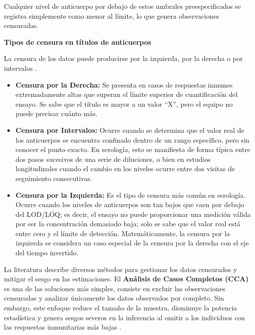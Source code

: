 Cualquier nivel de anticuerpo por debajo de estos umbrales preespecificados se registra simplemente como menor al límite, lo que genera observaciones censuradas.

\vspace{\baselineskip}
\textbf{Tipos de censura en títulos de anticuerpos}
\vspace{\baselineskip}

La censura de los datos puede producirse por la izquierda, por la derecha o por intervalos \cite{turkson, tran2021measuring}.
\begin{itemize}
	\item \textbf{Censura por la Derecha:} Se presenta en casos de respuestas inmunes extremadamente altas que superan el límite superior de cuantificación del ensayo. Se sabe que el título es mayor a un valor \enquote{X}, pero el equipo no puede precisar cuánto más.
	
	\item \textbf{Censura por Intervalos:} Ocurre cuando se determina que el valor real de los anticuerpos se encuentra confinado dentro de un rango específico, pero sin conocer el punto exacto. En serología, esto se manifiesta de forma típica entre dos pasos sucesivos de una serie de diluciones, o bien en estudios longitudinales cuando el cambio en los niveles ocurre entre dos visitas de seguimiento consecutivas.
	
	\item \textbf{Censura por la Izquierda:} Es el tipo de censura más común en serología. Ocurre cuando los niveles de anticuerpos son tan bajos que caen por debajo del LOD/LOQ; es decir, el ensayo no puede proporcionar una medición válida por ser la concentración demasiado baja; solo se sabe que el valor real está entre cero y el límite de detección. Matemáticamente, la censura por la izquierda se considera un caso especial de la censura por la derecha con el eje del tiempo invertido.
\end{itemize}

La literatura describe diversos métodos para gestionar los datos censurados y mitigar el sesgo en las estimaciones. El \textbf{Análisis de Casos Completos (CCA)} es una de las soluciones más simples, consiste en excluir las observaciones censuradas y analizar únicamente los datos observados por completo. Sin embargo, este enfoque reduce el tamaño de la muestra, disminuye la potencia estadística y genera sesgos severos en la inferencia al omitir a los individuos con las respuestas inmunitarias más bajas \cite{turkson,tran2021measuring}.

